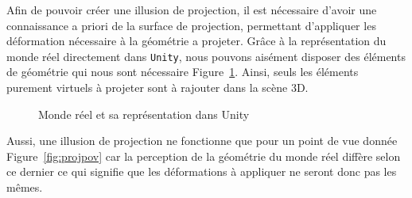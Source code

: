 Afin de pouvoir créer une illusion de projection, il est nécessaire d'avoir une connaissance a priori de la surface de projection, permettant d'appliquer les déformation nécessaire à la géométrie a projeter. Grâce à la représentation du monde réel directement dans \texttt{Unity}, nous pouvons aisément disposer des éléments de géométrie qui nous sont nécessaire Figure~\ref{fig:realvsunity}. Ainsi, seuls les éléments purement virtuels à projeter sont à rajouter dans la scène 3D.

\begin{figure}[H]
\centering
\caption{Monde réel et sa représentation dans Unity}
\label{fig:realvsunity}
\end{figure}

Aussi, une illusion de projection ne fonctionne que pour un point de vue donnée Figure~\ref{fig:projpov} car la perception de la géométrie du monde réel diffère selon ce dernier ce qui signifie que les déformations à appliquer ne seront donc pas les mêmes.

